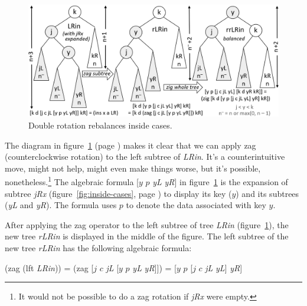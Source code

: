 \begin{figure}
\begin{center}
\includegraphics[scale=1]{images-cmyk/dbl-rotation}
\end{center}
\caption{Double rotation rebalances inside cases.}
\label{fig:dbl-rotation}
\end{figure}

The diagram in figure~\ref{fig:dbl-rotation} (page \pageref{fig:dbl-rotation})
makes it clear that we can apply \textsf{zag}
(counterclockwise rotation)
to the left subtree of \emph{LRin}.
It's a counterintuitive move, might not help, might even make things worse,
but it's possible, nonetheless.\footnote{\label{no-zag}It would not be possible
to do a \textsf{zag} rotation if \emph{jRx} were empty.}
The algebraic formula \textsf{[$y$ $p$} \emph{yL} \emph{yR}\textsf{]} in figure~\ref{fig:dbl-rotation}
is the expansion of subtree \emph{jRx}
(figure~\ref{fig:inside-cases}, page \pageref{fig:inside-cases})
to display its key ($y$) and its subtrees (\emph{yL} and \emph{yR}).
The formula uses $p$ to denote the data associated with key $y$.

After applying the \textsf{zag} operator to the left subtree of tree \emph{LRin}
(figure~\ref{fig:dbl-rotation}), the new tree \emph{rLRin} is displayed in
the middle of the figure. The left subtree of the new tree \emph{rLRin} has the following algebraic formula:
\begin{center}
\textsf{(zag (lft} \emph{LRin}\textsf{))} =
\textsf{(zag [$j$ $c$} \emph{jL} \textsf{[$y$ $p$} \emph{yL} \emph{yR}\textsf{]])} =
\textsf{[$y$ $p$ [$j$ $c$} \emph{jL} \emph{yL}\textsf{]} \emph{yR}\textsf{]}
\end{center}


